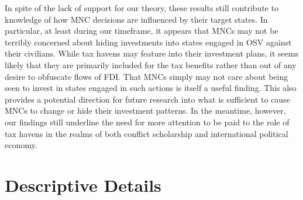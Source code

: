 \documentclass[11pt, titlepage]{article} %
\begin{document}
In spite of the lack of support for our theory, these results still contribute to knowledge of how MNC decisions are influenced by their target states. In particular, at least during our timeframe, it appears that MNCs may not be terribly concerned about hiding investments into states engaged in OSV against their civilians. While tax havens may feature into their investment plans, it seems likely that they are primarily included for the tax benefits rather than out of any desire to obfuscate flows of FDI. That MNCs simply may not care about being seen to invest in states engaged in such actions is itself a useful finding. This also provides a potential direction for future research into what is sufficient to cause MNCs to change or hide their investment patterns. In the meantime, however, our findings still underline the need for more attention to be paid to the role of tax havens in the realms of both conflict scholarship and international political economy.


\newpage
\printbibliography{}


\newpage
\appendix


\section*{Descriptive Details}
\label{appendix:descriptive} 

\FloatBarrier
\end{document}
